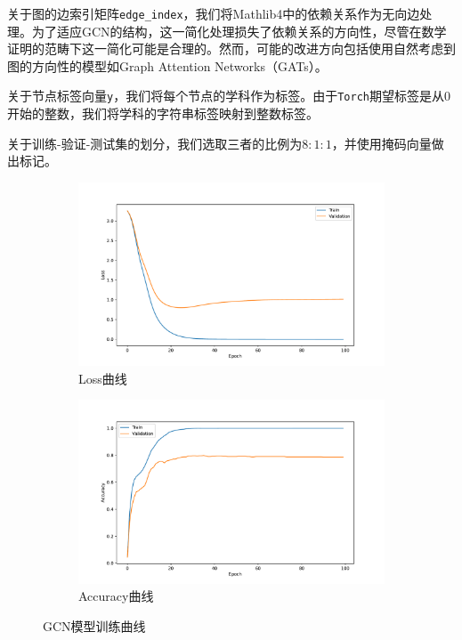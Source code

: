 关于图的边索引矩阵\texttt{edge\_index}，我们将Mathlib4中的依赖关系作为无向边处理。为了适应GCN的结构，这一简化处理损失了依赖关系的方向性，尽管在数学证明的范畴下这一简化可能是合理的。然而，可能的改进方向包括使用自然考虑到图的方向性的模型如Graph Attention Networks（GATs）。

关于节点标签向量\texttt{y}，我们将每个节点的学科作为标签。由于\texttt{Torch}期望标签是从0开始的整数，我们将学科的字符串标签映射到整数标签。

关于训练-验证-测试集的划分，我们选取三者的比例为$8:1:1$，并使用掩码向量做出标记。

\begin{figure}[htbp]
    \centering
    \begin{subfigure}{0.49\textwidth}
        \centering
        \includegraphics[width=\textwidth]{loss.pdf}
        \caption{Loss曲线}
    \end{subfigure}
    \begin{subfigure}{0.49\textwidth}
        \centering
        \includegraphics[width=\textwidth]{acc.pdf}
        \caption{Accuracy曲线}
    \end{subfigure}
    \caption{GCN模型训练曲线}
    \label{fig:gcn_train}
\end{figure}

